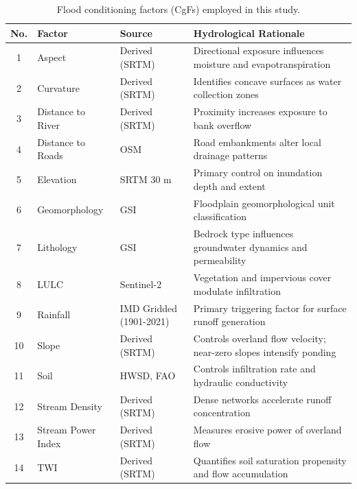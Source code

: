 \documentclass[12pt, a4paper]{article}
\begin{document}
\begin{table}[H]
\centering
\caption{Flood conditioning factors (CgFs) employed in this study.}
\label{tab:factors}
\small
\begin{tabularx}{\linewidth}{@{} c l l X @{}}
\toprule
\textbf{No.} & \textbf{Factor} & \textbf{Source} & \textbf{Hydrological Rationale} \\
\midrule
1  & Aspect              & Derived (SRTM)            & Directional exposure influences moisture and evapotranspiration \\
2  & Curvature           & Derived (SRTM)            & Identifies concave surfaces as water collection zones \\
3  & Distance to River   & Derived (SRTM)            & Proximity increases exposure to bank overflow \\
4  & Distance to Roads   & OSM                       & Road embankments alter local drainage patterns \\
5  & Elevation           & SRTM 30 m                 & Primary control on inundation depth and extent \\
6  & Geomorphology       & GSI                       & Floodplain geomorphological unit classification \\
7  & Lithology           & GSI                       & Bedrock type influences groundwater dynamics and permeability \\
8  & LULC                & Sentinel-2                & Vegetation and impervious cover modulate infiltration \\
9  & Rainfall            & IMD Gridded (1901-2021)   & Primary triggering factor for surface runoff generation \\
10 & Slope               & Derived (SRTM)            & Controls overland flow velocity; near-zero slopes intensify ponding \\
11 & Soil                & HWSD, FAO                 & Controls infiltration rate and hydraulic conductivity \\
12 & Stream Density      & Derived (SRTM)            & Dense networks accelerate runoff concentration \\
13 & Stream Power Index  & Derived (SRTM)            & Measures erosive power of overland flow \\
14 & TWI                 & Derived (SRTM)            & Quantifies soil saturation propensity and flow accumulation \\
\bottomrule
\end{tabularx}
\end{table}
\end{document}
